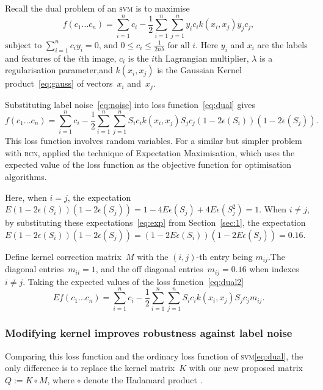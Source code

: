 \documentclass[12pt]{article} %
\newcommand{\svm}{\textsc{svm}}
\begin{document}
Recall the dual problem of an \textsc{svm} is to maximise
\begin{equation}
   f(c_{1}\ldots c_{n})=\sum _{i=1}^{n}c_{i}-{\frac {1}{2}}\sum _{i=1}^{n}\sum _{j=1}^{n}y_{i}c_{i}k(x_{i},x_{j})y_{j}c_{j}, \label{eq:dual}
\end{equation}
\begin{math}
{\text{subject to }}\sum _{i=1}^{n}c_{i}y_{i}=0,\,{\text{and }}0\leq c_{i}\leq {\frac {1}{2n\lambda }}\;{\text{for all }}i.
\end{math}
Here $y_i$ and $x_i$ are the labels and features of the $i$th image, $c_i$ is the $i$th Lagrangian multiplier, $\lambda$ is a regularisation parameter,and $k(x_i,x_j)$ is the Gaussian Kernel product~\eqref{eq:gauss} of vectors~$x_i$ and~$x_j$.

Substituting label noise~\eqref{eq:noise} into loss function~\eqref{eq:dual} gives
\begin{equation}
   f(c_{1}\ldots c_{n})=\sum _{i=1}^{n}c_{i}-{\frac {1}{2}}\sum _{i=1}^{n}\sum _{j=1}^{n}S_{i}c_{i}k(x_{i},x_{j})S_{j}c_{j}(1-2\epsilon(S_i))(1-2\epsilon(S_j)). \label{eq:dual2}
\end{equation}
This loss function involves random variables. For a similar  but simpler problem with \textsc{rcn}, \citet{pmlr-v20-biggio11} applied the technique of Expectation Maximisation, which uses the expected value of the loss function as the objective function for optimisation algorithms.

Here, when $i=j$, the expectation~$E(1-2\epsilon(S_i))(1-2\epsilon(S_j))=1-4E\epsilon(S_j)+4E\epsilon(S_j^2)=1$.
When $i\neq j$, by substituting these expectations~\eqref{eq:exp} from Section~\ref{sec:1}, the expectation~$E(1-2\epsilon(S_i))(1-2\epsilon(S_j))=(1-2E\epsilon(S_i))(1-2E\epsilon(S_j))=0.16$.

Define kernel correction matrix~$M$ with the $(i,j)$-th entry being $m_{ij}$.The diagonal entries~$m_{ii}=1 $, and the off diagonal entries~$m_{ij}=0.16$ when indexes~$i\neq j$. Taking the expected values of the loss function~\eqref{eq:dual2}
\begin{equation}
   Ef(c_{1}\ldots c_{n})=\sum _{i=1}^{n}c_{i}-{\frac {1}{2}}\sum _{i=1}^{n}\sum _{j=1}^{n}S_{i}c_{i}k(x_{i},x_{j})S_{j}c_{j}m_{ij}. \label{eq:dual3}
\end{equation}

\subsubsection{Modifying kernel improves robustness against label noise}
Comparing this loss function and the ordinary loss function of \svm \eqref{eq:dual}, the only difference is to replace the kernel matrix~$K$ with our new proposed matrix~$Q:=K\circ M$, where $\circ$ denote the Hadamard product \citep{hastie01statisticallearning}.
\end{document}
